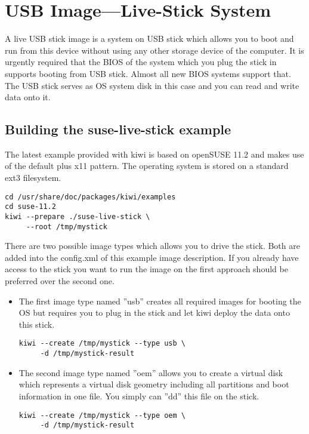 \chapter{USB Image---Live-Stick System}
\label{chapter:usb}
\minitoc

A live USB stick image is a system on USB stick which allows you to
boot and run from this device without using any other storage device of
the computer. It is urgently required that the BIOS of the system which
you plug the stick in supports booting from USB stick. Almost all
new BIOS systems support that. The USB stick serves as OS system disk
in this case and you can read and write data onto it.

\section{Building the suse-live-stick example}

The latest example provided with kiwi is based on openSUSE 11.2 and makes use
of the default plus x11 pattern. The operating system is stored on a
standard ext3 filesystem. 

\begin{Command}{12cm}
\begin{verbatim}
cd /usr/share/doc/packages/kiwi/examples
cd suse-11.2
kiwi --prepare ./suse-live-stick \
     --root /tmp/mystick
\end{verbatim}
\end{Command}

There are two possible image types which allows you to drive the
stick. Both are added into the config.xml of this example image
description. If you already have access to the stick you want to
run the image on the first approach should be preferred over the
second one.

\begin{itemize}
\item The first image type named ''usb'' creates all required
      images for booting the OS but requires you to plug in the stick
      and let kiwi deploy the data onto this stick.

      \begin{Command}{12cm}
      \begin{verbatim}
kiwi --create /tmp/mystick --type usb \
     -d /tmp/mystick-result
      \end{verbatim}
      \end{Command}

\item The second image type named ''oem'' allows you to create a
      virtual disk which represents a virtual disk geometry including
      all partitions and boot information in one file. You simply can ''dd''
      this file on the stick.

      \begin{Command}{12cm}
      \begin{verbatim}
kiwi --create /tmp/mystick --type oem \
     -d /tmp/mystick-result
      \end{verbatim}
      \end{Command}
\end{itemize}


